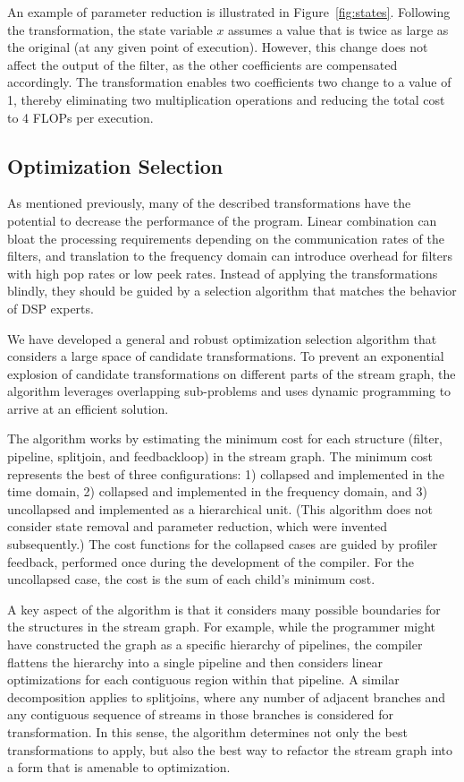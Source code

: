 An example of parameter reduction is illustrated in
Figure~\ref{fig:states}.  Following the transformation, the state
variable $x$ assumes a value that is twice as large as the original
(at any given point of execution).  However, this change does not
affect the output of the filter, as the other coefficients are
compensated accordingly.  The transformation enables two coefficients
two change to a value of 1, thereby eliminating two multiplication
operations and reducing the total cost to 4 FLOPs per execution.

\subsection*{Optimization Selection}

As mentioned previously, many of the described transformations have
the potential to decrease the performance of the program.  Linear
combination can bloat the processing requirements depending on the
communication rates of the filters, and translation to the frequency
domain can introduce overhead for filters with high pop rates or low
peek rates.  Instead of applying the transformations blindly, they
should be guided by a selection algorithm that matches the behavior of
DSP experts.

We have developed a general and robust optimization selection
algorithm that considers a large space of candidate transformations.
To prevent an exponential explosion of candidate transformations on
different parts of the stream graph, the algorithm leverages
overlapping sub-problems and uses dynamic programming to arrive at an
efficient solution.

The algorithm works by estimating the minimum cost for each structure
(filter, pipeline, splitjoin, and feedbackloop) in the stream
graph. The minimum cost represents the best of three configurations:
1) collapsed and implemented in the time domain, 2) collapsed and
implemented in the frequency domain, and 3) uncollapsed and
implemented as a hierarchical unit.  (This algorithm does not consider
state removal and parameter reduction, which were invented
subsequently.)  The cost functions for the collapsed cases are guided
by profiler feedback, performed once during the development of the
compiler.  For the uncollapsed case, the cost is the sum of each
child's minimum cost.

A key aspect of the algorithm is that it considers many possible
boundaries for the structures in the stream graph.  For example, while
the programmer might have constructed the graph as a specific
hierarchy of pipelines, the compiler flattens the hierarchy into a
single pipeline and then considers linear optimizations for each
contiguous region within that pipeline.  A similar decomposition
applies to splitjoins, where any number of adjacent branches and any
contiguous sequence of streams in those branches is considered for
transformation.  In this sense, the algorithm determines not only the
best transformations to apply, but also the best way to refactor the
stream graph into a form that is amenable to optimization.

